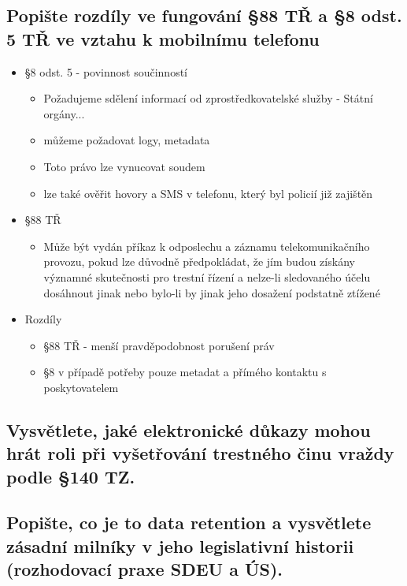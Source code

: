 \subsection{Popište rozdíly ve fungování §88 TŘ a §8 odst. 5 TŘ ve vztahu k mobilnímu telefonu}
\begin{itemize}
    \item §8 odst. 5 - povinnost součinností
    \begin{itemize}
        \item Požadujeme sdělení informací od zprostředkovatelské služby - Státní orgány...
        \item můžeme požadovat logy, metadata
        \item Toto právo lze vynucovat soudem
        \item lze také ověřit hovory a SMS v telefonu, který byl policií již zajištěn\\
    \end{itemize}
   
    \item §88 TŘ
    \begin{itemize}
        \item Může být vydán příkaz k odposlechu a záznamu telekomunikačního provozu, pokud lze důvodně předpokládat, že jím budou získány významné skutečnosti pro trestní řízení a nelze-li sledovaného účelu dosáhnout jinak nebo bylo-li by jinak jeho dosažení podstatně ztížené
    \end{itemize}
    \item Rozdíly
    \begin{itemize}
        \item §88 TŘ - menší pravděpodobnost porušení práv
        \item §8 v případě potřeby pouze metadat a přímého kontaktu s poskytovatelem
    \end{itemize}
\end{itemize}

\subsection{Vysvětlete, jaké elektronické důkazy mohou hrát roli při vyšetřování trestného činu vraždy podle §140 TZ.}

\subsection{Popište, co je to data retention a vysvětlete zásadní milníky v jeho legislativní historii (rozhodovací praxe SDEU a ÚS).}

